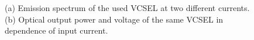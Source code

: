 \begin{figure}[tp]
\begin{subfigure}[t]{ 0.49\linewidth}
			\centering
			\caption{}
			\label{subfig::vcsel_output_power}
		\end{subfigure}
		\caption{(a) Emission spectrum of the used VCSEL at two different currents. (b) Optical output power and voltage of the same VCSEL in dependence of input current. \cite{}}
	\end{figure}

